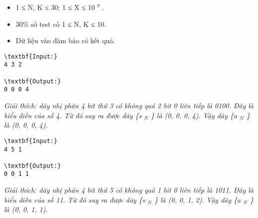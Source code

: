 \begin{itemize}
	\item     1 ≤ N, K ≤ 30; 1 ≤ X ≤ 10    $^     9    $    .   
	\item     30\% số test có 1 ≤ N, K ≤ 10.   
	\item     Dữ liệu vào đảm bảo có kết quả.   
\end{itemize}
\begin{verbatim}
\textbf{Input:}
4 3 2

\textbf{Output:}
0 0 0 4\end{verbatim}

\emph{    Giải thích: dãy nhị phân 4 bit thứ 3 có không quá 2 bit 0 liên tiếp là 0100. Đây là biểu diễn của số 4. Từ đó suy ra được dãy \{s    $_     N    $    \} là (0, 0, 0, 4). Vậy dãy \{a    $_     N    $    \} là (0, 0, 0, 4).   }
\begin{verbatim}
\textbf{Input:}
4 5 1

\textbf{Output:}
0 0 1 1\end{verbatim}

\emph{    Giải thích: dãy nhị phân 4 bit thứ 5 có không  quá 1 bit 0 liên tiếp là 1011. Đây là biểu diễn của số 11. Từ đó suy ra  được dãy \{s    $_     N    $    \} là (0, 0, 1, 2). Vậy dãy \{a    $_     N    $    \} là (0, 0, 1, 1).   }